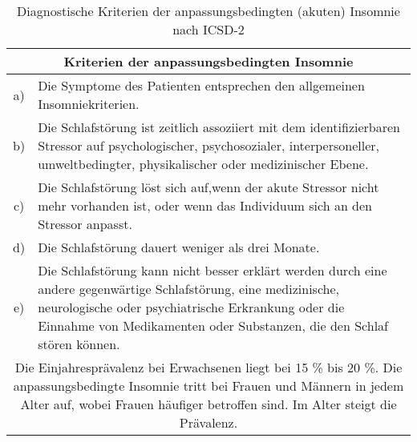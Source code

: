 \begin{table}[H] 
\centering
\begin{tabularx}{\textwidth}{cX}
\toprule
\multicolumn{2}{c}{\textbf{Kriterien der anpassungsbedingten Insomnie}}\\
\midrule 
a) & Die Symptome des Patienten entsprechen den allgemeinen Insomniekriterien.\\
b) & Die Schlafstörung ist zeitlich assoziiert mit dem identifizierbaren Stressor auf psychologischer, psychosozialer, interpersoneller, umweltbedingter, physikalischer oder medizinischer Ebene.\\
c) & Die Schlafstörung löst sich auf,wenn der akute Stressor nicht mehr vorhanden ist, oder wenn das Individuum sich an den Stressor anpasst.\\
d) & Die Schlafstörung dauert weniger als drei Monate.\\
e) & Die Schlafstörung kann nicht besser erklärt werden durch eine andere gegenwärtige Schlafstörung, eine medizinische, neurologische oder psychiatrische Erkrankung oder die Einnahme von Medikamenten oder Substanzen, die den Schlaf stören können.\\
\midrule
\multicolumn{2}{p{0.97\textwidth}}{Die Einjahresprävalenz bei Erwachsenen liegt bei 15 \% bis 20 \%. Die anpassungsbedingte Insomnie tritt bei Frauen und Männern in jedem Alter auf, wobei Frauen häufiger betroffen sind. Im Alter steigt die Prävalenz.}\\
\bottomrule
\end{tabularx}
\caption[Kriterien der anpassungsbedingten Insomnie]{Diagnostische Kriterien der anpassungsbedingten (akuten) Insomnie nach \acs{ICSD-2} \parencite{mayer_s3-leitlinie_2009, happe_schlafmedizin_2009}}
\label{tab:akute_insomnie}
\end{table}



